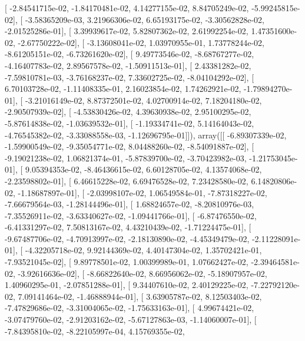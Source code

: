 \documentclass{article}
\begin{document}
       [ -2.84541715e-02,  -1.84170481e-02,   4.14277155e-02,
          8.84705249e-02,  -5.99245815e-02],
       [ -3.58365209e-03,   3.21966306e-02,   6.65193175e-02,
         -3.30562828e-02,  -2.01525286e-01],
       [  3.39939617e-02,   5.82807362e-02,   2.61992254e-02,
          1.47351600e-02,  -2.67750222e-02],
       [ -3.13608041e-02,   1.03970955e-01,   1.73778244e-02,
         -8.61205151e-02,  -6.73261620e-02],
       [  9.49773546e-02,  -8.68767277e-02,  -4.16407783e-02,
          2.89567578e-02,  -1.50911513e-01],
       [  2.43381282e-02,  -7.59810781e-03,  -3.76168237e-02,
          7.33602725e-02,  -8.04104292e-02],
       [  6.70103728e-02,  -1.11408335e-01,   2.16023854e-02,
          1.74262921e-02,  -1.79894270e-01],
       [ -3.21016149e-02,   8.87372501e-02,   4.02700914e-02,
          7.18204180e-02,  -2.90507939e-02],
       [ -4.53830426e-02,   4.39630938e-02,   2.95100295e-02,
         -5.87614838e-02,  -1.03639532e-01],
       [ -1.19334741e-02,   5.14164043e-02,  -4.76545382e-02,
         -3.33088558e-03,  -1.12696795e-01]]), array([[ -6.89307339e-02,  -1.59900549e-02,  -9.35054771e-02,
          8.04488260e-02,  -8.54091887e-02],
       [ -9.19021238e-02,   1.06821374e-01,  -5.87839700e-02,
         -3.70423982e-03,  -1.21753045e-01],
       [  9.05394353e-02,  -8.46436615e-02,   6.60128705e-02,
          4.13574068e-02,  -2.23598802e-01],
       [  6.46615228e-02,   6.69476528e-02,   7.23428580e-02,
          6.14820806e-02,  -1.18687897e-01],
       [ -2.03998107e-02,   1.06549584e-01,  -7.87318227e-02,
         -7.66679564e-03,  -1.28144496e-01],
       [  1.68824657e-02,  -8.20810976e-03,  -7.35526911e-02,
         -3.63340627e-02,  -1.09441766e-01],
       [ -6.87476550e-02,  -6.41331297e-02,   7.50813167e-02,
          4.43210439e-02,  -1.71224475e-01],
       [ -9.67487706e-02,  -4.70913997e-02,  -2.18130890e-02,
         -4.45349479e-02,  -2.11228091e-01],
       [ -4.32205718e-02,   9.92144369e-02,   4.40147304e-02,
          1.35702421e-01,  -7.93521045e-02],
       [  9.89778501e-02,   1.00399989e-01,   1.07662427e-02,
         -2.39464581e-02,  -3.92616636e-02],
       [ -8.66822640e-02,   8.66956062e-02,  -5.18907957e-02,
          1.40960295e-01,  -2.07851288e-01],
       [  9.34407610e-02,   2.40129225e-02,  -7.22792120e-02,
          7.09141464e-02,  -1.46888944e-01],
       [  3.63905787e-02,   8.12503403e-02,  -7.47829686e-02,
         -3.31004065e-02,  -1.75633163e-01],
       [  4.99674421e-02,  -3.07479760e-02,  -2.91203162e-02,
         -5.67127863e-03,  -1.14060007e-01],
       [ -7.84395810e-02,  -8.22105997e-04,   4.15769355e-02,
\end{document}
